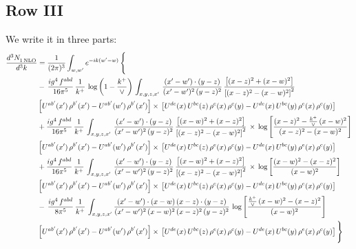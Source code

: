 \documentclass[9pt]{article}
\numberwithin{equation}{section}
\begin{document}
\subsection{Row III}
We write it in three parts:
\begin{align}
   \frac{d^{3}N_{1\,\rm NLO}^{\rm}}{d^{3}k}  & =  \frac{1}{(2\pi)^{3}}  \int_{w, w^\prime} e^{-ik(w^\prime-w)}\, \Bigg\{\notag \\
& -\,\frac{ig^{4}\,f^{abd}}{16\pi^{5}}\,\frac{1}{k^{+}}\,\log{\left(1-\frac{k^{+}}{\vee}\right)}\,\int_{x,y,z,x'}\, \frac{(x'-w')\cdot (y-z)}{(x'-w')^{2}\,(y-z)^{2}}\,\frac{\left[(x-z)^{2}+(x-w)^{2}\right]}{\left[(x-z)^{2}-(x-w)^{2}\right]^{2}}\notag \\ & \left[U^{ab'}(x')\,\rho^{b'}(x')-U^{ab'}(w')\, \rho^{b'}(x')\right]\times\, \left[U^{de}(x)\,U^{bc}(z)\, \rho^{e}(x)\,\rho^{c}(y)-U^{de}(x)\,U^{bc}(y)\,\rho^{e}(x)\,\rho^{c}(y)\right] \notag \\
&  +\frac{ig^{4}\,f^{abd}}{16\pi^{5}}\, \frac{1}{k^{+}}\,\int_{x,y,z,x'}\, \frac{(x'-w')\cdot (y-z)}{(x'-w')^{2}\,(y-z)^{2}}\, \frac{\left[(x-w)^{2}+(x-z)^{2}\right]}{\left[(x-z)^{2}-(x-w)^{2}\right]^{2}}\, \times\, \log{\left[\frac{(x-z)^{2}-\frac{k^{+}}{\vee}\,(x-w)^{2}}{(x-z)^{2}-(x-w)^{2}}\right]}\notag \\ & \left[U^{ab'}(x')\,\rho^{b'}(x')-U^{ab'}(w')\, \rho^{b'}(x')\right]\times\, \left[U^{de}(x)\,U^{bc}(z)\, \rho^{e}(x)\,\rho^{c}(y)-U^{de}(x)\,U^{bc}(y)\,\rho^{e}(x)\,\rho^{c}(y)\right] \notag \\
&  +\frac{ig^{4}\,f^{abd}}{16\pi^{5}}\, \frac{1}{k^{+}}\,\int_{x,y,z,x'}\, \frac{(x'-w')\cdot (y-z)}{(x'-w')^{2}\,(y-z)^{2}}\, \frac{\left[(x-w)^{2}+(x-z)^{2}\right]}{\left[(x-z)^{2}-(x-w)^{2}\right]^{2}}\, \times\, \log{\left[\frac{(x-w)^{2}-(x-z)^{2}}{(x-w)^{2}}\right]}\notag \\ & \left[U^{ab'}(x')\,\rho^{b'}(x')-U^{ab'}(w')\, \rho^{b'}(x')\right]\times\, \left[U^{de}(x)\,U^{bc}(z)\, \rho^{e}(x)\,\rho^{c}(y)-U^{de}(x)\,U^{bc}(y)\,\rho^{e}(x)\,\rho^{c}(y)\right] \notag \\
&-\, \frac{ig^{4}\,f^{abd}}{8\pi^{5}}\,\frac{1}{k^{+}}\,\int_{x,y,z,x'}\frac{(x'-w')\cdot (x-w)\, (x-z)\cdot (y-z)}{(x'-w')^{2}\, (x-w)^{2}\, (x-z)^{2}\, (y-z)^{2}}\,\log{\left[\frac{\frac{k^{+}}{\vee}\,(x-w)^{2}-(x-z)^{2}}{(x-w)^{2}}\right]} \notag \\ & \left[U^{ab'}(x')\,\rho^{b'}(x')-U^{ab'}(w')\, \rho^{b'}(x')\right]\times\, \left[U^{de}(x)\,U^{bc}(z)\, \rho^{e}(x)\,\rho^{c}(y)-U^{de}(x)\,U^{bc}(y)\,\rho^{e}(x)\,\rho^{c}(y)\right]\Bigg\}
\end{align}
\end{document}
